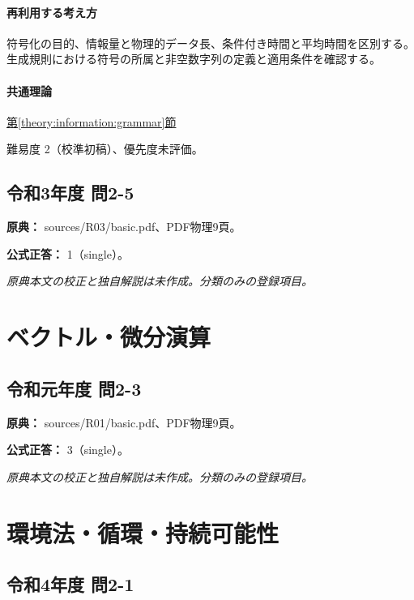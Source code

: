 \paragraph{再利用する考え方} 符号化の目的、情報量と物理的データ長、条件付き時間と平均時間を区別する。生成規則における符号の所属と非空数字列の定義と適用条件を確認する。

\paragraph{共通理論} \hyperref[theory:information:grammar]{第\ref*{theory:information:grammar}節}

\par 難易度 2（校準初稿）、優先度未評価。

\subsection{令和3年度 問2-5}
\label{q:r03-reg-basic-2-5}

\noindent\textbf{原典：} sources/R03/basic.pdf、PDF物理9頁。

\textbf{公式正答：} 1（single）。

\par\textit{原典本文の校正と独自解説は未作成。分類のみの登録項目。}

\section{ベクトル・微分演算}

\subsection{令和元年度 問2-3}
\label{q:r01-reg-basic-2-3}

\noindent\textbf{原典：} sources/R01/basic.pdf、PDF物理9頁。

\textbf{公式正答：} 3（single）。

\par\textit{原典本文の校正と独自解説は未作成。分類のみの登録項目。}

\section{環境法・循環・持続可能性}

\subsection{令和4年度 問2-1}
\label{q:r04-reg-basic-2-1}

